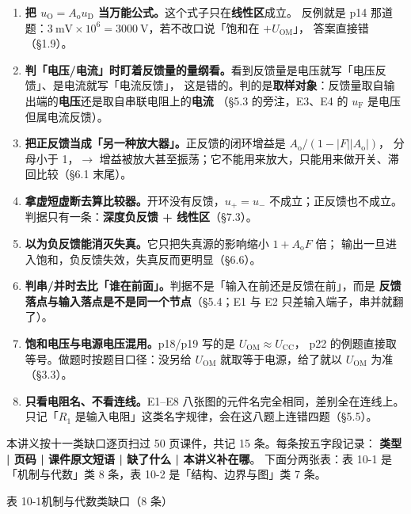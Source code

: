 \documentclass[11pt]{ctexart}
\begin{document}
\begin{enumerate}
\item \textbf{把 $u_{\mathrm{O}}=A_{\mathrm{o}}u_{\mathrm{D}}$ 当万能公式。}这个式子只在\textbf{线性区}成立。
反例就是 p14 那道题：$3\ \mathrm{mV}\times10^{6}=3000\ \mathrm{V}$，若不改口说「饱和在 $+U_{\mathrm{OM}}$」，
答案直接错（§1.9）。
\item \textbf{判「电压/电流」时盯着反馈量的量纲看。}看到反馈量是电压就写「电压反馈」、是电流就写「电流反馈」，
这是错的。判的是\textbf{取样对象}：反馈量取自输出端的\textbf{电压}还是取自串联电阻上的\textbf{电流}
（§5.3 的旁注，E3、E4 的 $u_{\mathrm{F}}$ 是电压但属电流反馈）。
\item \textbf{把正反馈当成「另一种放大器」。}正反馈的闭环增益是 $A_{\mathrm{o}}/(1-|F||A_{\mathrm{o}}|)$，
分母小于 1，$\to$ 增益被放大甚至振荡；它不能用来放大，只能用来做开关、滞回比较（§6.1 末尾）。
\item \textbf{拿虚短虚断去算比较器。}开环没有反馈，$u_+=u_-$ 不成立；正反馈也不成立。
判据只有一条：\textbf{深度负反馈 + 线性区}（§7.3）。
\item \textbf{以为负反馈能消灭失真。}它只把失真源的影响缩小 $1+A_{\mathrm{o}}F$ 倍；
输出一旦进入饱和，负反馈失效，失真反而更明显（§6.6）。
\item \textbf{判串/并时去比「谁在前面」。}判据不是「输入在前还是反馈在前」，而是
\textbf{反馈落点与输入落点是不是同一个节点}（§5.4；E1 与 E2 只差输入端子，串并就翻了）。
\item \textbf{饱和电压与电源电压混用。}p18/p19 写的是 $U_{\mathrm{OM}}\approx U_{\mathrm{CC}}$，
p22 的例题直接取等号。做题时按题目口径：没另给 $U_{\mathrm{OM}}$ 就取等于电源，给了就以 $U_{\mathrm{OM}}$ 为准（§3.3）。
\item \textbf{只看电阻名、不看连线。}E1--E8 八张图的元件名完全相同，差别全在连线上。
只记「$R_1$ 是输入电阻」这类名字规律，会在这八题上连错四题（§5.5）。
\end{enumerate}


本讲义按十一类缺口逐页扫过 50 页课件，共记 15 条。每条按五字段记录：
\textbf{类型 | 页码 | 课件原文短语 | 缺了什么 | 本讲义补在哪}。
下面分两张表：表 10-1 是「机制与代数」类 8 条，表 10-2 是「结构、边界与图」类 7 条。

\needspace{0.58\textheight}
表 10-1\quad 机制与代数类缺口（8 条）
\end{document}
